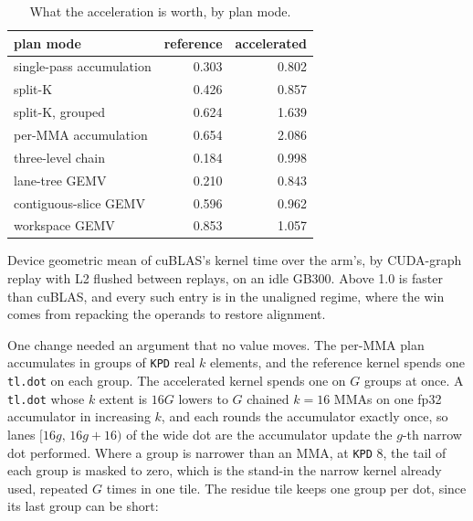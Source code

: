 \documentclass[sigplan,nonacm]{acmart}
\begin{document}
\begin{table}[t]
  \centering
  \caption{What the acceleration is worth, by plan mode.}
  \label{tab:accel}
  \footnotesize
  \begin{tabular}{lrr}
    \toprule
    plan mode & reference & accelerated \\
    \midrule
    single-pass accumulation      & 0.303 & 0.802 \\
    split-K                       & 0.426 & 0.857 \\
    split-K, grouped              & 0.624 & 1.639 \\
    per-MMA accumulation          & 0.654 & 2.086 \\
    three-level chain             & 0.184 & 0.998 \\
    lane-tree GEMV                & 0.210 & 0.843 \\
    contiguous-slice GEMV         & 0.596 & 0.962 \\
    workspace GEMV                & 0.853 & 1.057 \\
    \bottomrule
  \end{tabular}

  \vspace{2pt}
  \parbox{\columnwidth}{\footnotesize Device geometric mean of cuBLAS's kernel
  time over the arm's, by CUDA-graph replay with L2 flushed between replays, on
  an idle GB300. Above 1.0 is faster than cuBLAS, and every such entry is in the
  unaligned regime, where the win comes from repacking the operands to restore
  alignment.}
\end{table}

One change needed an argument that no value moves. The per-MMA plan accumulates
in groups of \texttt{KPD} real $k$ elements, and the reference kernel spends one
\texttt{tl.dot} on each group. The accelerated kernel spends one on $G$ groups
at once. A \texttt{tl.dot} whose $k$ extent is $16G$ lowers to $G$ chained
$k=16$ MMAs on one fp32 accumulator in increasing $k$, and each rounds the
accumulator exactly once, so lanes $[16g,\,16g+16)$ of the wide dot are the
accumulator update the $g$-th narrow dot performed. Where a group is narrower
than an MMA, at \texttt{KPD} 8, the tail of each group is masked to zero, which
is the stand-in the narrow kernel already used, repeated $G$ times in one tile.
The residue tile keeps one group per dot, since its last group can be short:
\end{document}
